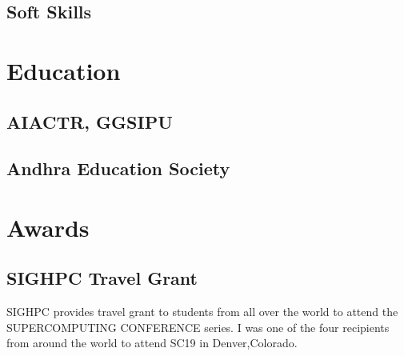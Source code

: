 \documentclass[]{deedy-resume-openfont}
\begin{document}
\begin{minipage}[t]{0.33\textwidth}
\subsection{Soft Skills}
\sectionsep

\section{Education} 

\subsection{AIACTR, GGSIPU}
\sectionsep

\subsection{Andhra Education Society}
\sectionsep


\section{Awards} 
\subsection{SIGHPC Travel Grant}
SIGHPC provides travel grant to students from all over the world to attend the SUPERCOMPUTING CONFERENCE series.
I was one of the four recipients from around the world to attend SC19 in Denver,Colorado.
\sectionsep

%
%

\end{minipage} 
\hfill
\end{document}

